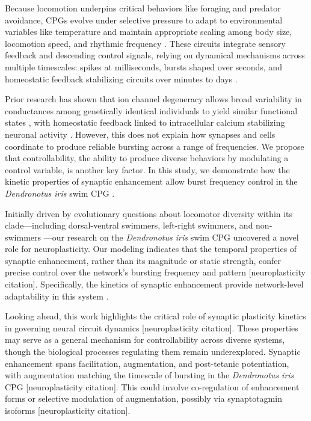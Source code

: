 \documentclass[nofootinbib,aip,amsmath,amssymb,reprint,twocolumn,10pt]{revtex4-2}
\begin{document}
Because locomotion underpins critical behaviors like foraging and predator avoidance, CPGs evolve under selective pressure to adapt to environmental variables like temperature and maintain appropriate scaling among body size, locomotion speed, and rhythmic frequency \cite{Marder2023}.
These circuits integrate sensory feedback and descending control signals, relying on dynamical mechanisms across multiple timescales: spikes at milliseconds, bursts shaped over seconds, and homeostatic feedback stabilizing circuits over minutes to days \cite{MarderCalabrese1996}.

Prior research has shown that ion channel degeneracy allows broad variability in conductances among genetically identical individuals to yield similar functional states \cite{Marder2011, OLeary2014}, with homeostatic feedback linked to intracellular calcium stabilizing neuronal activity \cite{Franci2020}.
However, this does not explain how synapses and cells coordinate to produce reliable bursting across a range of frequencies.
We propose that controllability, the ability to produce diverse behaviors by modulating a control variable, is another key factor.
In this study, we demonstrate how the kinetic properties of synaptic enhancement allow burst frequency control in the \textit{Dendronotus iris} swim CPG \cite{SakuraiKatz2016}.

Initially driven by evolutionary questions about locomotor diversity within its clade---including dorsal-ventral swimmers, left-right swimmers, and non-swimmers \cite{Newcomb2012}---our research on the \textit{Dendronotus iris} swim CPG uncovered a novel role for neuroplasticity.
Our modeling indicates that the temporal properties of synaptic enhancement, rather than its magnitude or static strength, confer precise control over the network's bursting frequency and pattern [neuroplasticity citation].
Specifically, the kinetics of synaptic enhancement provide network-level adaptability in this system \cite{SakuraiKatz2016}.

Looking ahead, this work highlights the critical role of synaptic plasticity kinetics in governing neural circuit dynamics [neuroplasticity citation].
These properties may serve as a general mechanism for controllability across diverse systems, though the biological processes regulating them remain underexplored.
Synaptic enhancement spans facilitation, augmentation, and post-tetanic potentiation, with augmentation matching the timescale of bursting in the \textit{Dendronotus iris} CPG [neuroplasticity citation].
This could involve co-regulation of enhancement forms or selective modulation of augmentation, possibly via synaptotagmin isoforms [neuroplasticity citation].
\end{document}
